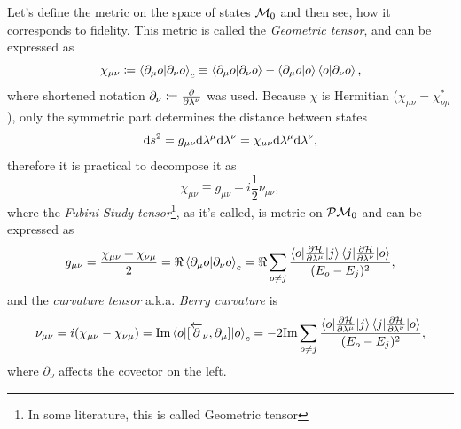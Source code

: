 Let's define the metric on the space of states $\mathcal{M}_0$ and then see, how it corresponds to fidelity. This metric is called the \emph{Geometric tensor}, and can be expressed as 
\begin{equation}
    \chi_{\mu\nu}\coloneqq \braket{\partial_\mu o|\partial_\nu o}_c \equiv \braket{\partial_\mu o|\partial_\nu o} - \braket{\partial_\mu o|o}\braket{o|\partial_\nu o},
    \label{eq:geometricTensor}
\end{equation}
where shortened notation $\partial_\nu\coloneqq\frac{\partial }{\partial \lambda^\nu}$ was used.
Because $\chi$ is Hermitian ($\chi_{\mu\nu}=\chi^*_{\nu\mu}$), only the symmetric part determines the distance between states
\begin{equation}
    \mathrm{d} s^2= g_{\mu\nu}\mathrm{d} \lambda^\mu \mathrm{d}\lambda^\nu= \chi_{\mu\nu}\mathrm{d} \lambda^\mu \mathrm{d}\lambda^\nu,
\end{equation}
therefore it is practical to decompose it as
\begin{equation}
    \chi_{\mu\nu} \equiv g_{\mu\nu} - i\frac{1}{2} \nu_{\mu\nu},
\end{equation}
where the \emph{Fubini-Study tensor}\footnote{In some literature, this is called Geometric tensor}, as it's called, is metric on $\mathcal{P}\mathcal{M}_0$ and can be expressed as
\begin{equation}
    g_{\mu\nu} = \frac{\chi_{\mu\nu}+\chi_{\nu\mu}}{2} = \Re\braket{\partial_\mu o|\partial_\nu o}_c = \Re \sum_{o\neq j}\frac{\braket{o|\frac{\partial \mathcal{H}}{\partial \lambda^\mu}|j}\braket{j|\frac{\partial \mathcal{H}}{\partial \lambda^\nu}|o}}{(E_o-E_j)^2},
    \label{eq:metrictensorREdefinition}
\end{equation}
and the \emph{curvature tensor} a.k.a. \emph{Berry curvature} is
\begin{equation}
        \nu_{\mu\nu} = i(\chi_{\mu\nu}-\chi_{\nu\mu})= \textrm{Im}\braket{o|[\overleftarrow{\partial}_\nu,\partial_\mu]|o}_c = -2 \textrm{Im} \sum_{o\neq j}\frac{\braket{o|\frac{\partial \mathcal{H}}{\partial \lambda^\mu}|j}\braket{j|\frac{\partial \mathcal{H}}{\partial \lambda^\nu}|o}}{(E_o-E_j)^2},
    \label{eq:geom.tensorREdefinition}
\end{equation}
where $\overleftarrow{\partial}_\nu$ affects the covector on the left.



